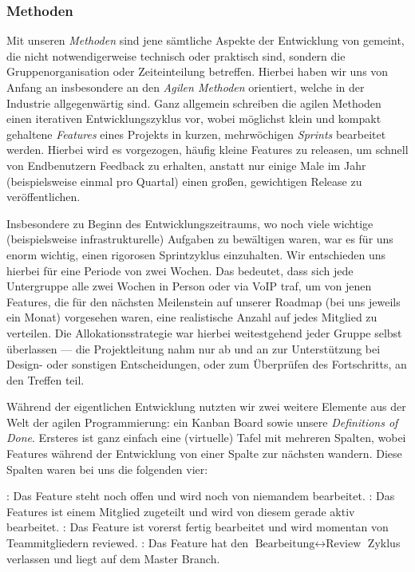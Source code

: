 
\subsubsection{Methoden}
\label{team:orga-workflow-methods}

Mit unseren \emph{Methoden} sind jene sämtliche Aspekte der Entwicklung von
\erasim{} gemeint, die nicht notwendigerweise technisch oder praktisch sind,
sondern die Gruppenorganisation oder Zeiteinteilung betreffen. Hierbei haben wir
uns von Anfang an insbesondere an den \emph{Agilen Methoden} orientiert, welche
in der Industrie allgegenwärtig sind. Ganz allgemein schreiben die agilen
Methoden einen iterativen Entwicklungszyklus vor, wobei möglichst klein und
kompakt gehaltene \emph{Features} eines Projekts in kurzen, mehrwöchigen
\emph{Sprints} bearbeitet werden. Hierbei wird es vorgezogen, häufig kleine
Features zu releasen, um schnell von Endbenutzern Feedback zu erhalten, anstatt
nur einige Male im Jahr (beispielsweise einmal pro Quartal) einen großen,
gewichtigen Release zu veröffentlichen.

Insbesondere zu Beginn des Entwicklungszeitraums, wo noch viele wichtige
(beispielsweise infrastrukturelle) Aufgaben zu bewältigen waren, war es für uns
enorm wichtig, einen rigorosen Sprintzyklus einzuhalten. Wir entschieden uns
hierbei für eine Periode von zwei Wochen. Das bedeutet, dass sich jede
Untergruppe alle zwei Wochen in Person oder via VoIP traf, um von jenen
Features, die für den nächsten Meilenstein auf unserer Roadmap (bei uns jeweils
ein Monat) vorgesehen waren, eine realistische Anzahl auf jedes Mitglied zu
verteilen. Die Allokationsstrategie war hierbei weitestgehend jeder Gruppe
selbst überlassen --- die Projektleitung nahm nur ab und an zur Unterstützung
bei Design- oder sonstigen Entscheidungen, oder zum Überprüfen des Fortschritts,
an den Treffen teil.

Während der eigentlichen Entwicklung nutzten wir zwei weitere Elemente aus der
Welt der agilen Programmierung: ein Kanban Board sowie unsere \emph{Definitions
of Done}. Ersteres ist ganz einfach eine (virtuelle) Tafel mit mehreren Spalten, wobei Features während der Entwicklung von einer Spalte zur nächsten wandern. Diese Spalten waren bei uns die folgenden vier:

\begin{senumerate}{-0.5cm}
  : Das Feature steht noch offen und wird noch von niemandem
  bearbeitet.
  : Das Features ist einem Mitglied zugeteilt und wird von
  diesem gerade aktiv bearbeitet.
  : Das Feature ist vorerst fertig bearbeitet und wird momentan
  von Teammitgliedern reviewed.
  : Das Feature hat den $\text{Bearbeitung} \leftrightarrow
  \text{Review}$ Zyklus verlassen und liegt auf dem Master Branch.
\end{senumerate}
\vspace{-0.5cm}

